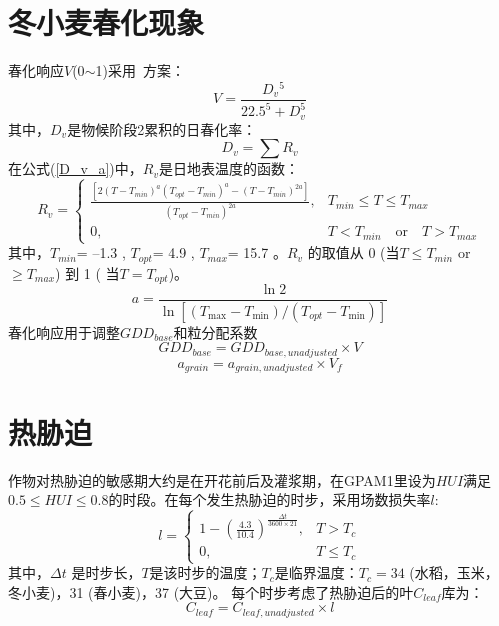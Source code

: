 \section{冬小麦春化现象}
春化响应$V$(0$\sim$1)采用~\citet{streck2003incorporating}方案：
\begin{equation}
V=\frac{D_{v}{ }^{5}}{22.5^{5}+D_{v}^{5}}
\end{equation}
其中，$D_v$是物候阶段2累积的日春化率：
\begin{equation}\label{D_v_a}
D_{v}=\sum R_{v}
\end{equation}
在公式(\ref{D_v_a})中，$R_{v}$是日地表温度的函数：
\begin{equation}
R_{v} = \begin{cases} 
\frac{\left[2\left(T-T_{min}\right)^{a}\left(T_{opt}-T_{min}\right)^{a} - \left(T-T_{min}\right)^{2a}\right]}{\left(T_{opt}-T_{min}\right)^{2a}}, &T_{min} \leq T \leq T_{max} \\
0,  &T<T_{min} \quad  \text{or} \quad T>T_{max}
\end{cases}
\end{equation}
其中，$T_{min}$= –1.3 \textcelsius, $T_{opt}$= 4.9 \textcelsius, $T_{max}$= 15.7 \textcelsius。$ R_v$ 的取值从 0 (当$ T\leq T_{min}$ or $ \geq  T_{max}$) 到 1 ( 当$T=T_{opt}$)。
\begin{equation}
a=\frac{\ln 2}{\ln \left[\left(T_{\max }-T_{\min }\right) /\left(T_{o p t}-T_{\min }\right)\right]}
\end{equation}
春化响应用于调整$GDD_{base}$和粒分配系数
\begin{equation}
G D D_{b a s e}=G D D_{b a s e,  { unadjusted }} \times V
\end{equation}
\begin{equation}
a_{ {grain }}=a_{ {grain,unadjusted }} \times V_{f}
\end{equation}


\section{热胁迫}
作物对热胁迫的敏感期大约是在开花前后及灌浆期，在GPAM1里设为$HUI $满足$0.5 \leq HUI \leq 0.8$的时段。在每个发生热胁迫的时步，采用场数损失率$l$:
\begin{equation}
l=\left\{\begin{array}{cc}1-\left(\frac{4.3}{10.4}\right)^{\frac{\Delta t}{3600\times 21}}, & T>T_{c} \\ 0, & T \leq T_{c}\end{array}\right.
\end{equation}
其中，$\Delta t$ 是时步长，$T$是该时步的温度；$T_c$是临界温度：$T_c=34$ \textcelsius (水稻，玉米，冬小麦)，31 \textcelsius (春小麦)，37 \textcelsius (大豆)。
每个时步考虑了热胁迫后的叶$C_{leaf}$库为：
\begin{equation}
C_{leaf}=C_{leaf,  {unadjusted}} \times l
\end{equation}


